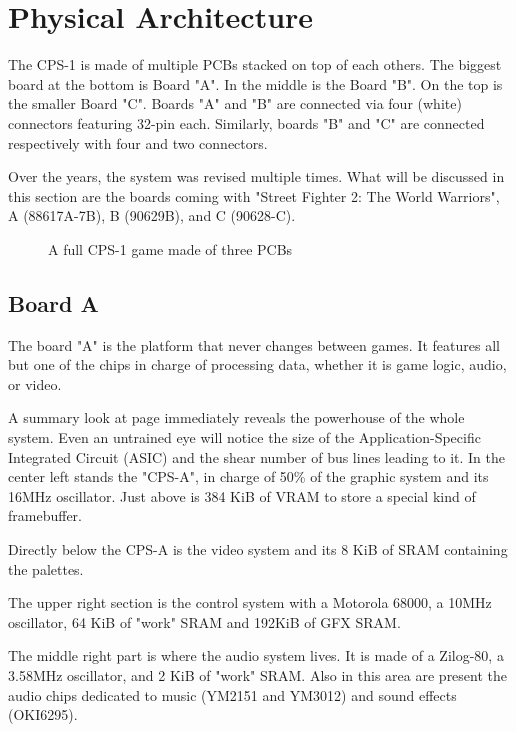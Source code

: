   


\section{Physical Architecture}
 The CPS-1 is made of multiple PCBs stacked on top of each others. The biggest board at the bottom is Board "A". In the middle is the Board "B". On the top is the smaller Board "C". Boards "A" and "B" are connected via four (white) connectors featuring 32-pin each. Similarly, boards "B" and "C" are connected respectively with four and two connectors.

Over the years, the system was revised multiple times. What will be discussed in this section are the boards coming  with "Street Fighter 2: The World Warriors", A (88617A-7B), B (90629B), and C (90628-C).

\begin{figure}[H]
\centering
{}
\caption*{A full CPS-1 game made of three PCBs}
\end{figure}


\subsection{Board A} 
The board "A" is the platform that never changes between games. It features all but one of the chips in charge of processing data, whether it is game logic, audio, or video.

A summary look at page \pageref{fig:boarda} immediately reveals the powerhouse of the whole system. Even an untrained eye will notice the size of the Application-Specific Integrated Circuit (ASIC) and the shear number of bus lines leading to it. In the center left stands the "CPS-A", in charge of 50\% of the graphic system and its 16MHz oscillator. Just above is 384 KiB of VRAM to store a special kind of framebuffer.

Directly below the CPS-A is the video system and its 8 KiB of SRAM containing the palettes.

The upper right section is the control system with a Motorola 68000, a 10MHz oscillator, 64 KiB of "work" SRAM and 192KiB of GFX SRAM. 

The middle right part is where the audio system lives. It is made of a Zilog-80, a 3.58MHz oscillator, and 2 KiB of "work" SRAM. Also in this area are present the audio chips dedicated to music (YM2151 and YM3012) and sound effects (OKI6295).

